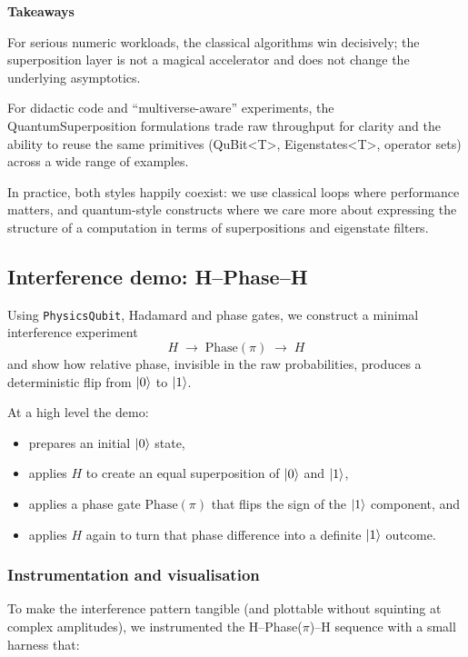 \documentclass[a4paper,11pt]{article}
\begin{document}
\textbf{Takeaways}

For serious numeric workloads, the classical algorithms win decisively; the superposition layer is not a magical accelerator and does not change the underlying asymptotics.

For didactic code and ``multiverse-aware'' experiments, the QuantumSuperposition formulations trade raw throughput for clarity and the ability to reuse the same primitives (QuBit\textless T\textgreater, Eigenstates\textless T\textgreater, operator sets) across a wide range of examples.

In practice, both styles happily coexist: we use classical loops where performance matters, and quantum-style constructs where we care more about expressing the structure of a computation in terms of superpositions and eigenstate filters.

\subsection{Interference demo: H--Phase--H}\label{sec:interference-demo}

Using \texttt{PhysicsQubit}, Hadamard and phase gates, we construct a minimal interference experiment
\[
  H \;\rightarrow\; \mathrm{Phase}(\pi) \;\rightarrow\; H
\]
and show how relative phase, invisible in the raw probabilities, produces a deterministic flip from $\lvert 0 \rangle$ to $\lvert 1 \rangle$.

At a high level the demo:

\begin{itemize}
  \item prepares an initial $\lvert 0 \rangle$ state,
  \item applies $H$ to create an equal superposition of $\lvert 0 \rangle$ and $\lvert 1 \rangle$,
  \item applies a phase gate $\mathrm{Phase}(\pi)$ that flips the sign of the $\lvert 1 \rangle$ component, and
  \item applies $H$ again to turn that phase difference into a definite $\lvert 1 \rangle$ outcome.
\end{itemize}

\subsubsection{Instrumentation and visualisation}

To make the interference pattern tangible (and plottable without squinting at complex amplitudes), we instrumented the H--Phase($\pi$)--H sequence with a small harness that:
\end{document}
